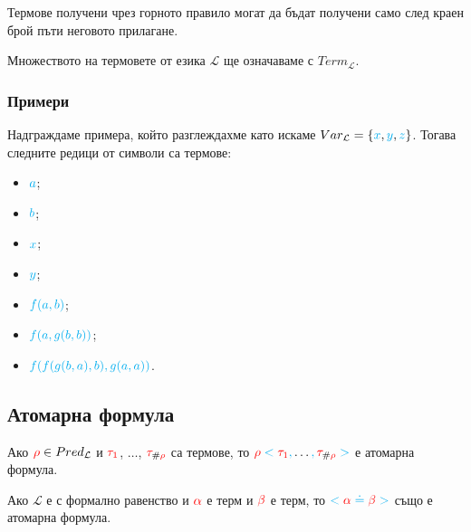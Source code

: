 \documentclass{article}[12pt]
\newcommand{\Lang}{\mathcal{L}}
\begin{document}
\vspace{0.5cm}

Термове получени чрез горното правило могат да бъдат получени само след краен брой пъти неговото прилагане.

\vspace{0.5cm}

Множеството на термовете от езика \(\Lang\) ще означаваме с \(Term_\Lang\).

\subsubsection{Примери}

Надграждаме примера, който разглеждахме като искаме \(Var_\Lang = \{\color{cyan} x \color{black}, \color{cyan} y \color{black} , \color{cyan} z \color{black} \}\).
Тогава следните редици от символи са термове:

\begin{itemize}
\item \(\color{cyan}a\);
\item \(\color{cyan}b\);
\item \(\color{cyan}x\);
\item \(\color{cyan}y\);
\item \(\color{cyan}f(a, b)\);
\item \(\color{cyan}f(a, g(b, b))\);
\item \(\color{cyan}f(f(g(b, a), b), g(a, a))\).
\end{itemize}

\subsection{Атомарна формула}

Ако \(\color{red}\rho \color{black} \in Pred_\Lang\) и \(\color{red}\tau_1\), \(\dots\), \(\color{red}\tau_{\color{black}\#\color{red}\rho}\) са термове,
то \(\color{red}\rho \color{cyan} < \color{red} \tau_1 \color{cyan} , \color{black} \dots \color{cyan} , \color{red} \tau_{\color{black}\#\color{red}\rho} \color{cyan} >\)
е атомарна формула.

\vspace{0.5cm}

Ако \(\Lang\) е с формално равенство и \(\color{red} \alpha\) е терм и \(\color{red} \beta\) е терм,
то \(\color{cyan} < \color{red} \alpha \color{cyan} \doteq \color{red} \beta \color{cyan} >\) също е атомарна формула.

\vspace{0.5cm}
\end{document}

